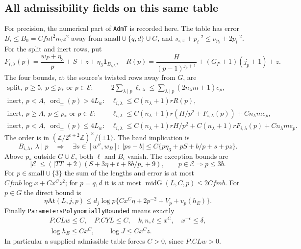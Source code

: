 \subsection{All admissibility fields on this same table}

For precision, the numerical part of \texttt{AdmT} is recorded here.
The table has error $B_i\le B_0=Cfnt^2n_Vz^2$ away from
$\mathrm{small}\cup\{q,d\}\cup G$, and
$s_{i,\pi}+p_i^{-2}\le\nu_{p_i}+2p_i^{-2}$.
For the split and inert rows, put
\[
 F_{i,\lambda}(p)=\frac{w_P+\eta_3}{p}+S+z+
                          \eta_3\mathbf1_{B_{i,\lambda}},
 \quad R(p)=\frac H{(p-1)^{j_p+1}}+(G_P+1)(j_p+1)+z.     \tag{DNE.11}
\]
The four bounds, at the source's twisted rows away from $G$, are
\[
\begin{array}{ll}
\text{split},\ p\ge5,\ p\le p_*\text{ or }p\in\mathcal E:
 &2\sum_{\lambda\mid p}\ell_{i,\lambda}
       \le\sum_{\lambda\mid p}(2n_\lambda m+1)e_p,\\[2pt]
\text{inert},\ p<A,\ \operatorname{ord}_{\pm}(p)>4L_w:
 &\ell_{i,\lambda}\le C(n_\lambda+1)rR(p),\\[2pt]
\text{inert},\ p\ge A,\ p\le p_*\text{ or }p\in\mathcal E:
 &\ell_{i,\lambda}\le C(n_\lambda+1)r(H/p^2+F_{i,\lambda}(p))
                              +Cn_\lambda m e_p,\\[2pt]
\text{inert},\ p<A,\ \operatorname{ord}_{\pm}(p)\le4L_w:
 &\ell_{i,\lambda}\le C(n_\lambda+1)rH/p^2
       +C(n_\lambda+1)rF_{i,\lambda}(p)+Cn_\lambda m e_p.
\end{array}                                                     \tag{DNE.12}
\]
The order is in
$(\mathbb Z/2^{e+2}\mathbb Z)^\times/\{\pm1\}$.
The band implication is
\[
 B_{i,\lambda},\ \lambda\mid p\quad\Longrightarrow\quad
 \exists s\in[w'',w_B]:\ |ps-b|
   \le C\{p\eta_3+pS+b/p+s+pz\}.                       \tag{DNE.13}
\]
Above $p_*$ outside $G\cup\mathcal E$, both $\ell$ and $B_i$ vanish.
The exception bounds are
\[
 |\mathcal E|\le(|TT|+2)(S+3\eta+t+8b/p_*+9),\qquad
                    p\in\mathcal E\Longrightarrow p\le3b.       \tag{DNE.14}
\]
For $p\in\mathrm{small}\cup\{3\}$ the sum of the lengths and
error is at most $Cfm b\log x+Cx^Cz^2$; for $p=q,d$ it is at most
$\operatorname{midG}(L,C,p)\le2Cfm b$.
For $p\in G$ the direct bound is
\[
 \eta\mathrm{At}(L,j,p)\le
    d_j\log p\{Cx^C\eta+2p^{-2}+V_p+v_p(h_E)\}.        \tag{DNE.15}
\]
Finally \texttt{ParametersPolynomiallyBounded} means exactly
\[
 \begin{gathered}
  P.CLw\le C,\quad P.CYL\le C,\quad k,n,t\le x^C,
  \quad x^{-\epsilon}\le\delta,\\
  \log h_E\le Cx^C,\qquad \log J\le Cx^Cz .
 \end{gathered}                                                   \tag{DNE.16}
\]
In particular a supplied admissible table forces $C>0$, since
$P.CLw>0$.

